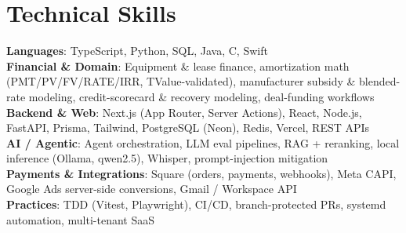 \documentclass[letterpaper,11pt]{article}
\begin{document}
\section{Technical Skills}
\begin{itemize}[leftmargin=0.15in, label={}]
    \small{\item{
     \textbf{Languages}{: TypeScript, Python, SQL, Java, C, Swift} \\
     \textbf{Financial \& Domain}{: Equipment \& lease finance, amortization math (PMT/PV/FV/RATE/IRR, TValue-validated), manufacturer subsidy \& blended-rate modeling, credit-scorecard \& recovery modeling, deal-funding workflows} \\
     \textbf{Backend \& Web}{: Next.js (App Router, Server Actions), React, Node.js, FastAPI, Prisma, Tailwind, PostgreSQL (Neon), Redis, Vercel, REST APIs} \\
     \textbf{AI / Agentic}{: Agent orchestration, LLM eval pipelines, RAG + reranking, local inference (Ollama, qwen2.5), Whisper, prompt-injection mitigation} \\
     \textbf{Payments \& Integrations}{: Square (orders, payments, webhooks), Meta CAPI, Google Ads server-side conversions, Gmail / Workspace API} \\
     \textbf{Practices}{: TDD (Vitest, Playwright), CI/CD, branch-protected PRs, systemd automation, multi-tenant SaaS}
    }}
\end{itemize}
\end{document}
